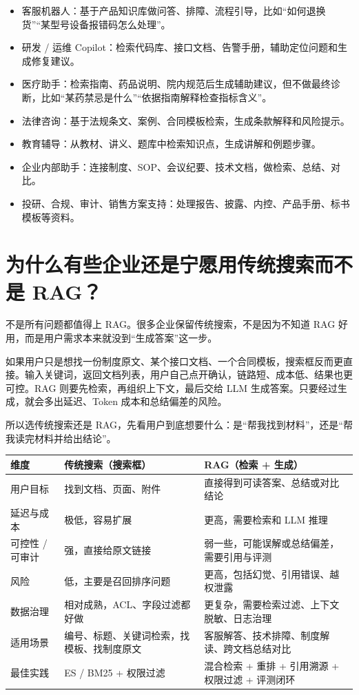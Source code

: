 \documentclass[10pt,a4paper]{ctexart}
\begin{document}
\begin{itemize}[itemsep=2pt, topsep=4pt]
  \item 客服机器人：基于产品知识库做问答、排障、流程引导，比如“如何退换货”“某型号设备报错码怎么处理”。
  \item 研发 / 运维 Copilot：检索代码库、接口文档、告警手册，辅助定位问题和生成修复建议。
  \item 医疗助手：检索指南、药品说明、院内规范后生成辅助建议，但不做最终诊断，比如“某药禁忌是什么”“依据指南解释检查指标含义”。
  \item 法律咨询：基于法规条文、案例、合同模板检索，生成条款解释和风险提示。
  \item 教育辅导：从教材、讲义、题库中检索知识点，生成讲解和例题步骤。
  \item 企业内部助手：连接制度、SOP、会议纪要、技术文档，做检索、总结、对比。
  \item 投研、合规、审计、销售方案支持：处理报告、披露、内控、产品手册、标书模板等资料。
\end{itemize}


\section{为什么有些企业还是宁愿用传统搜索而不是 RAG？}


不是所有问题都值得上 RAG。很多企业保留传统搜索，不是因为不知道 RAG 好用，而是用户需求本来就没到“生成答案”这一步。



如果用户只是想找一份制度原文、某个接口文档、一个合同模板，搜索框反而更直接。输入关键词，返回文档列表，用户自己点开确认，链路短、成本低、结果也更可控。RAG 则要先检索，再组织上下文，最后交给 LLM 生成答案。只要经过生成，就会多出延迟、Token 成本和总结偏差的风险。



所以选传统搜索还是 RAG，先看用户到底想要什么：是“帮我找到材料”，还是“帮我读完材料并给出结论”。


{\footnotesize
\begin{tabularx}{\textwidth}{|X|X|X|}
\hline
\textbf{维度} & \textbf{传统搜索（搜索框）} & \textbf{RAG（检索 + 生成）} \\
\hline
用户目标 & 找到文档、页面、附件 & 直接得到可读答案、总结或对比结论 \\
\hline
延迟与成本 & 极低，容易扩展 & 更高，需要检索和 LLM 推理 \\
\hline
可控性 / 可审计 & 强，直接给原文链接 & 弱一些，可能误解或总结偏差，需要引用与评测 \\
\hline
风险 & 低，主要是召回排序问题 & 更高，包括幻觉、引用错误、越权泄露 \\
\hline
数据治理 & 相对成熟，ACL、字段过滤都好做 & 更复杂，需要检索过滤、上下文脱敏、日志治理 \\
\hline
适用场景 & 编号、标题、关键词检索，找模板、找制度原文 & 客服解答、技术排障、制度解读、跨文档总结对比 \\
\hline
最佳实践 & ES / BM25 + 权限过滤 & 混合检索 + 重排 + 引用溯源 + 权限过滤 + 评测闭环 \\
\hline
\end{tabularx}
}
\end{document}
